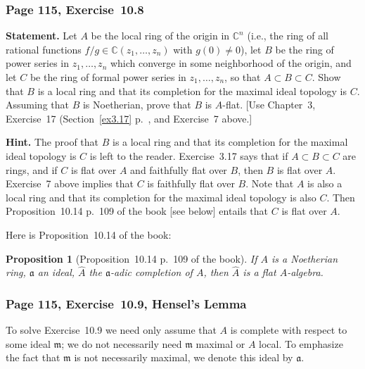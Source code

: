 \documentclass[12pt,letterpaper]{article}%
\newcommand{\mf}{\mathfrak}
\newcommand{\aaa}{\mf a}
\newcommand{\mmm}{\mf m}
\newcommand{\xr}{\xrightarrow}
\newcommand{\nn}{\noindent}
\newtheorem{prop}[thm]{Proposition}
\begin{document}
\subsubsection{Page 115, Exercise~10.8}%

\textbf{Statement.} Let $A$ be the local ring of the origin in $\mathbb C^n$ (i.e., the ring of all rational functions $f/g\in\mathbb C(z_1,\ldots,z_n)$ with $g(0)\ne0$), let $B$ be the ring of power series in $z_1,\ldots,z_n$ which converge in some neighborhood of the origin, and let $C$ be the ring of formal power series in $z_1,\ldots,z_n$, so that $A\subset B\subset C$. Show that $B$ is a local ring and that its completion for the maximal ideal topology is $C$. Assuming that $B$ is Noetherian, prove that $B$ is $A$-flat. [Use Chapter~3, Exercise~17 (Section~\ref{ex3.17} p.~\pageref{ex3.17}, %
and Exercise~7 above.]

\nn\textbf{Hint.} The proof that $B$ is a local ring and that its completion for the maximal ideal topology is $C$ is left to the reader. Exercise~3.17 says that if $A\subset B\subset C$ are rings, and if $C$ is flat over $A$ and faithfully flat over $B$, then $B$ is flat over $A$. Exercise~7 above implies that $C$ is faithfully flat over $B$. Note that $A$ is also a local ring and that its completion for the maximal ideal topology is also $C$. Then Proposition~10.14 p.~109 of the book [see below] entails that $C$ is flat over $A$.

Here is Proposition~10.14 of the book:
\begin{prop}[Proposition~10.14 p.~109 of the book]\label{p10.14}
If $A$ is a Noetherian ring, $\aaa$ an ideal, $\widehat A$ the $\aaa$-adic completion of $A$, then $\widehat A$ is a flat $A$-algebra.
\end{prop}

\subsubsection{Page 115, Exercise~10.9, Hensel's Lemma}%

To solve Exercise~10.9 we need only assume that $A$ is complete with respect to some ideal $\mmm$; we do not necessarily need $\mmm$ maximal or $A$ local. To emphasize the fact that $\mmm$ is not necessarily maximal, we denote this ideal by $\aaa$.
\end{document}
